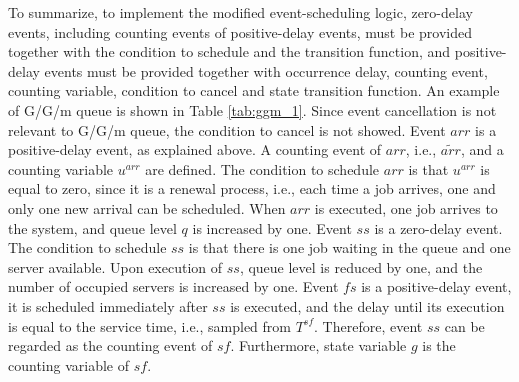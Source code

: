 \documentclass[]{interact}
\theoremstyle{plain}%
\theoremstyle{definition}
\theoremstyle{remark}
\begin{document}
To summarize, to implement the modified event-scheduling logic, zero-delay events, including counting events of positive-delay events, must be provided together with the condition to schedule and the transition function, and positive-delay events must be provided together with occurrence delay, counting event, counting variable, condition to cancel and state transition function. An example of G/G/m queue is shown in Table \ref{tab:ggm_1}. Since event cancellation is not relevant to G/G/m queue, the condition to cancel is not showed. Event ${arr}$ is a positive-delay event, as explained above. %
A counting event of ${arr}$, i.e., ${\tilde{arr}}$, and a counting variable $u^{arr}$ are defined. The condition to schedule ${arr}$ is that $u^{arr}$ is equal to zero, since it is a renewal process, i.e., each time a job arrives, one and only one new arrival can be scheduled. When ${arr}$ is executed, one job arrives to the system, and queue level $q$ is increased by one. Event ${ss}$ is a zero-delay event. The condition to schedule ${ss}$ is that there is one job waiting in the queue and one server available. Upon execution of ${ss}$, queue level is reduced by one, and the number of occupied servers is increased by one. Event ${fs}$ is a positive-delay event, it is scheduled immediately after ${ss}$ is executed, and the delay until its execution is equal to the service time, i.e., sampled from $T^{sf}$. Therefore, event ${ss}$ can be regarded as the counting event of ${sf}$. Furthermore, state variable $g$ is the counting variable of ${sf}$. %
\end{document}
